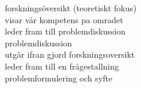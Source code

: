 forskningsöversikt (teoretiskt fokus)\\
  visar vår kompetens pa omradet\\
  leder fram till problemdiskussion\\

problemdiskussion\\
  utgår ifran gjord forskningsoversikt\\
  leder fram till en frågestallning\\

problemformulering och syfte\\


